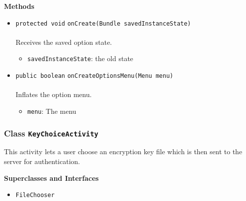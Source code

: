 \textbf{\sffamily Methods}
\begin{itemize}
\item \lstinline|protected void| \lstinline|onCreate|\lstinline|(Bundle savedInstanceState)|\\ \\[-0.6em]
Receives the saved option state.
\begin{itemize}
\item \lstinline|savedInstanceState|: the old state
\end{itemize}



\item \lstinline|public boolean| \lstinline|onCreateOptionsMenu|\lstinline|(Menu menu)|\\ \\[-0.6em]
Inflates the option menu.
\begin{itemize}
\item \lstinline|menu|: The menu
\end{itemize}



\end{itemize}

\subsubsection{Class \lstinline|KeyChoiceActivity|}
This activity lets a user choose an encryption key file
 which is then sent to the server for authentication. \\
\noindent\begin{minipage}[t]{5cm}
\vspace{0.3em}
\hspace*{2em}
\vspace{0.3em}
\end{minipage}



\textbf{\sffamily Superclasses and Interfaces}
\begin{itemize}
\item \lstinline|FileChooser|
\end{itemize}



